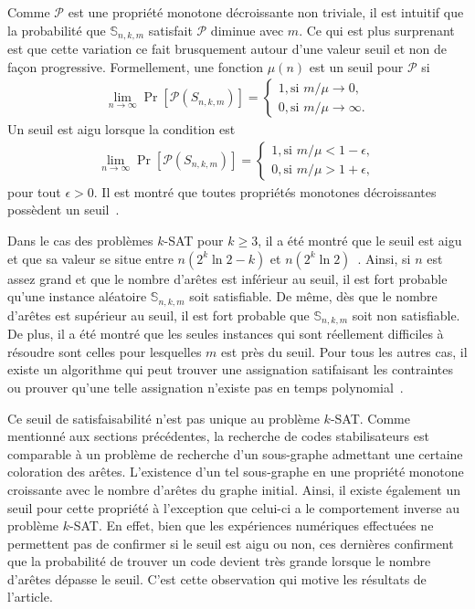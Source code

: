 Comme $\mathcal P$ est une propriété monotone décroissante non triviale,
il est intuitif que la probabilité que $\mathbb S_{n,k,m}$ satisfait 
$\mathcal P$ diminue avec $m$.
Ce qui est plus surprenant est que cette variation ce fait brusquement 
autour d'une valeur seuil et non de façon progressive.
Formellement,
une fonction $\mu(n)$ est un seuil pour $\mathcal P$ si 
\begin{align}
  \lim_{n \to \infty} \Pr[\mathcal P(S_{n,k,m})] 
  =
  \begin{cases}
    1, \text{si } m / \mu \to 0, \\
    0, \text{si } m / \mu \to \infty.
  \end{cases}
\end{align}
Un seuil est aigu lorsque la condition est 
\begin{align}
  \lim_{n \to \infty} \Pr[\mathcal P(S_{n,k,m})] 
  =
  \begin{cases}
    1, \text{si } m / \mu < 1 - \epsilon, \\
    0, \text{si } m / \mu > 1 + \epsilon,
  \end{cases}
\end{align}
pour tout $\epsilon > 0$.
Il est montré que toutes propriétés monotones décroissantes
possèdent un seuil~\cite{bollobas_threshold_1987}.

Dans le cas des problèmes $k$-SAT pour $k \geq 3$,
il a été montré que le seuil est aigu et que sa valeur se
situe entre $n(2^k \ln 2 - k)$ et $n(2^k \ln 2)$~\cite{achlioptas_rigorous_2005}.
Ainsi, si $n$ est assez grand et que le nombre d'arêtes est inférieur au seuil,
il est fort probable qu'une instance aléatoire $\mathbb S_{n,k,m}$ soit satisfiable.
De même,
dès que le nombre d'arêtes est supérieur au seuil,
il est fort probable que $\mathbb S_{n, k, m}$ soit non satisfiable.
De plus, il a été montré que les seules instances qui sont réellement difficiles
à résoudre sont celles pour lesquelles $m$ est près du seuil.
Pour tous les autres cas,
il existe un algorithme qui peut trouver une assignation satifaisant les contraintes
ou prouver qu'une telle assignation n'existe pas en temps polynomial~\cite{cheeseman_where_1991}.

Ce seuil de satisfaisabilité n'est pas unique au problème $k$-SAT.
Comme mentionné aux sections précédentes,
la recherche de codes stabilisateurs est comparable à un problème de recherche d'un sous-graphe
admettant une certaine coloration des arêtes.
L'existence d'un tel sous-graphe
en une propriété monotone croissante avec le nombre d'arêtes du graphe initial.
Ainsi,
il existe également un seuil pour cette propriété à l'exception que celui-ci a le comportement 
inverse au problème $k$-SAT.
En effet,
bien que les expériences numériques effectuées ne permettent pas de confirmer si le seuil 
est aigu ou non,
ces dernières confirment que la probabilité de trouver un code devient
très grande lorsque le nombre d'arêtes dépasse le seuil.
C'est cette observation qui motive les résultats de l'article.

